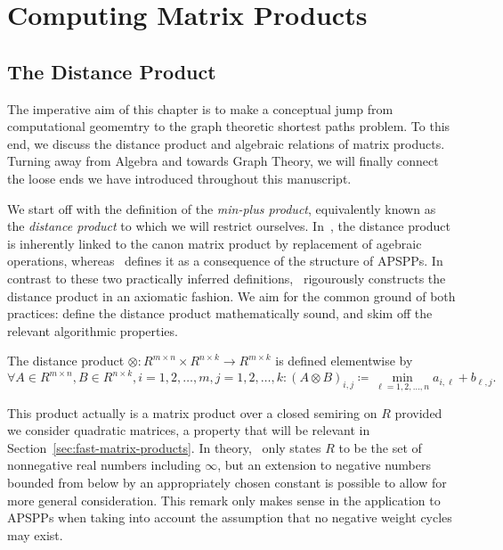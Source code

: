 \chapter{Computing Matrix Products}

\section{The Distance Product}\label{sec:dist-prod}

The imperative aim of this chapter is to make a conceptual jump from computational geomemtry to the graph theoretic shortest paths problem.
To this end, we discuss the distance product and algebraic relations of matrix products.
Turning away from Algebra and towards Graph Theory, we will finally connect the loose ends we have introduced throughout this manuscript.

We start off with the definition of the \emph{min-plus product}, equivalently known as the \emph{distance product} to which we will restrict ourselves.
In~\cite[Chapter~25]{Cormen2001}, the distance product is inherently linked to the canon matrix product by replacement of agebraic operations, whereas~\cite{Chan2007} defines it as a consequence of the structure of APSPPs.
In contrast to these two practically inferred definitions,\ \cite[Section~5.6]{Aho1974} rigourously constructs the distance product in an axiomatic fashion.
We aim for the common ground of both practices: define the distance product mathematically sound, and skim off the relevant algorithmic properties.

\begin{definition}\label{def:distance-product}
    The distance product $\otimes: R^{m \times n} \times R^{n \times k} \rightarrow R^{m \times k}$ is defined elementwise by
    \[
        \forall A \in R^{m \times n}, B \in R^{n \times k}, i = 1, 2, \dots, m, j = 1, 2, \dots, k: {\left( A \otimes B \right)}_{i, j} \coloneqq \min\limits_{\ell = 1, 2, \dots, n} a_{i, \ell} + b_{\ell, j}.
    \]
\end{definition}

This product actually is a matrix product over a closed semiring on $R$ provided we consider quadratic matrices, a property that will be relevant in Section~\ref{sec:fast-matrix-products}.
In theory,\ \cite[Example~5.9]{Aho1974} only states $R$ to be the set of nonnegative real numbers including $\infty$, but an extension to negative numbers bounded from below by an appropriately chosen constant is possible to allow for more general consideration.
This remark only makes sense in the application to APSPPs when taking into account the assumption that no negative weight cycles may exist.

